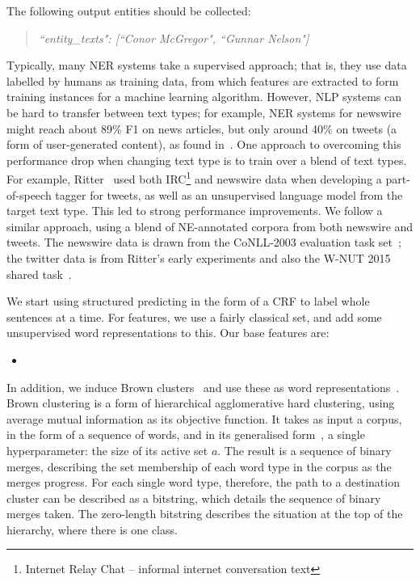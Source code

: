\documentclass[journal,10pt,draftclsnofoot,onecolumn]{IEEEtran}
\begin{document}
The following output entities should be collected:

\begin{quote}
\emph{``entity\_texts": [``Conor McGregor", ``Gunnar Nelson"]}
\end{quote}

Typically, many NER systems take a supervised approach; that is, they use data labelled by humans as training data, from which features are extracted to form training instances for a machine learning algorithm.
However, NLP systems can be hard to transfer between text types; for example, NER systems for newswire might reach about 89\% F1 on news articles, but only around 40\% on tweets (a form of user-generated content), as found in~\cite{derczynski2015analysis}.
One approach to overcoming this performance drop when changing text type is to train over a blend of text types.
For example, Ritter~\cite{ritter2011named} used both IRC\footnote{Internet Relay Chat -- informal internet conversation text} and newswire data when developing a part-of-speech tagger for tweets, as well as an unsupervised language model from the target text type.
This led to strong performance improvements.
We follow a similar approach, using a blend of NE-annotated corpora from both newswire and tweets.
The newswire data is drawn from the CoNLL-2003 evaluation task set~\cite{tjong2003introduction}; the twitter data is from Ritter's early experiments and also the W-NUT 2015 shared task~\cite{ritter2011named,baldwin2015shared}.

We start using structured predicting in the form of a CRF to label whole sentences at a time.
For features, we use a fairly classical set, and add some unsupervised word representations to this.
Our base features are:

\begin{itemize}
\item 
\end{itemize}

In addition, we induce Brown clusters~\cite{brown1992class} and use these as word representations~\cite{turian2009preliminary}.
Brown clustering is a form of hierarchical agglomerative hard clustering, using average mutual information as its objective function.
It takes as input a corpus, in the form of a sequence of words, and in its generalised form~\cite{derczynski2016generalised}, a single hyperparameter: the size of its active set $a$.
The result is a sequence of binary merges, describing the set membership of each word type in the corpus as the merges progress.
For each single word type, therefore, the path to a destination cluster can be described as a bitstring, which details the sequence of binary merges taken.
The zero-length bitstring describes the situation at the top of the hierarchy, where there is one class.
\end{document}
